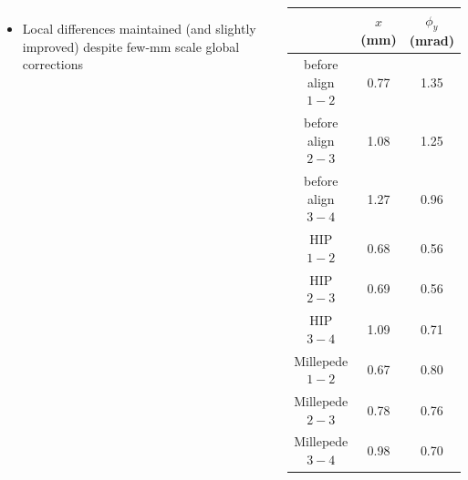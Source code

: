 \documentclass[compress]{beamer}
\begin{document}
\begin{frame}
\begin{columns}
\begin{itemize}
\item Local differences maintained (and slightly improved) despite
  few-mm scale global corrections
\end{itemize}

\begin{center}
\tiny
\begin{tabular}{c c c}
& $x$ (mm) & $\phi_y$ (mrad) \\\hline
before align $1-2$ & 0.77 & 1.35 \\
before align $2-3$ & 1.08 & 1.25 \\
before align $3-4$ & 1.27 & 0.96 \\\hline
HIP $1-2$ & 0.68 & 0.56 \\
HIP $2-3$ & 0.69 & 0.56 \\
HIP $3-4$ & 1.09 & 0.71 \\\hline
Millepede $1-2$ & 0.67 & 0.80 \\
Millepede $2-3$ & 0.78 & 0.76 \\
Millepede $3-4$ & 0.98 & 0.70
\end{tabular}
\end{center}
\end{columns}
\end{frame}
\end{document}
